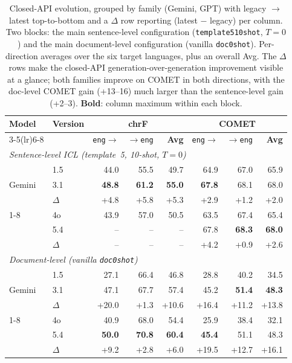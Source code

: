 \begin{table}[t]
\centering
\small
\setlength{\tabcolsep}{4pt}
\renewcommand{\arraystretch}{1.05}
\begin{tabular}{llrrrrrr}
\toprule
\textbf{Model} & \textbf{Version} & \multicolumn{3}{c}{\textbf{chrF}} & \multicolumn{3}{c}{\textbf{COMET}} \\
\cmidrule(lr){3-5}\cmidrule(lr){6-8}
 &  & \texttt{eng$\to$} & \texttt{$\to$eng} & \textbf{Avg} & \texttt{eng$\to$} & \texttt{$\to$eng} & \textbf{Avg} \\
\midrule
\multicolumn{8}{l}{\textit{Sentence-level ICL (template~5, 10-shot, $T{=}0$)}} \\
\midrule
\multirow{3}{*}{Gemini} & 1.5 & 44.0 & 55.5 & 49.7 & 64.9 & 67.0 & 65.9 \\
 & 3.1 & \textbf{48.8} & \textbf{61.2} & \textbf{55.0} & \textbf{67.8} & 68.1 & 68.0 \\
 & $\Delta$ & +4.8 & +5.8 & +5.3 & +2.9 & +1.2 & +2.0 \\
\cmidrule(lr){1-8}
\multirow{3}{*}{GPT} & 4o & 43.9 & 57.0 & 50.5 & 63.5 & 67.4 & 65.4 \\
 & 5.4 & -- & -- & -- & 67.8 & \textbf{68.3} & \textbf{68.0} \\
 & $\Delta$ & -- & -- & -- & +4.2 & +0.9 & +2.6 \\
\midrule\midrule
\multicolumn{8}{l}{\textit{Document-level (vanilla \texttt{doc\textunderscore{}0shot})}} \\
\midrule
\multirow{3}{*}{Gemini} & 1.5 & 27.1 & 66.4 & 46.8 & 28.8 & 40.2 & 34.5 \\
 & 3.1 & 47.1 & 67.7 & 57.4 & 45.2 & \textbf{51.4} & \textbf{48.3} \\
 & $\Delta$ & +20.0 & +1.3 & +10.6 & +16.4 & +11.2 & +13.8 \\
\cmidrule(lr){1-8}
\multirow{3}{*}{GPT} & 4o & 40.9 & 68.0 & 54.4 & 25.9 & 38.4 & 32.1 \\
 & 5.4 & \textbf{50.0} & \textbf{70.8} & \textbf{60.4} & \textbf{45.4} & 51.1 & 48.3 \\
 & $\Delta$ & +9.2 & +2.8 & +6.0 & +19.5 & +12.7 & +16.1 \\
\bottomrule
\end{tabular}
\caption{Closed-API evolution, grouped by family (Gemini, GPT) with legacy $\to$ latest top-to-bottom and a $\Delta$ row reporting (latest $-$ legacy) per column. Two blocks: the main sentence-level configuration (\texttt{template5\textunderscore{}10shot}, $T{=}0$) and the main document-level configuration (vanilla \texttt{doc\textunderscore{}0shot}). Per-direction averages over the six target languages, plus an overall Avg. The $\Delta$ rows make the closed-API generation-over-generation improvement visible at a glance; both families improve on COMET in both directions, with the doc-level COMET gain (+13--16) much larger than the sentence-level gain (+2--3). \textbf{Bold}: column maximum within each block.}
\label{tab:closed_evolution}
\end{table}
